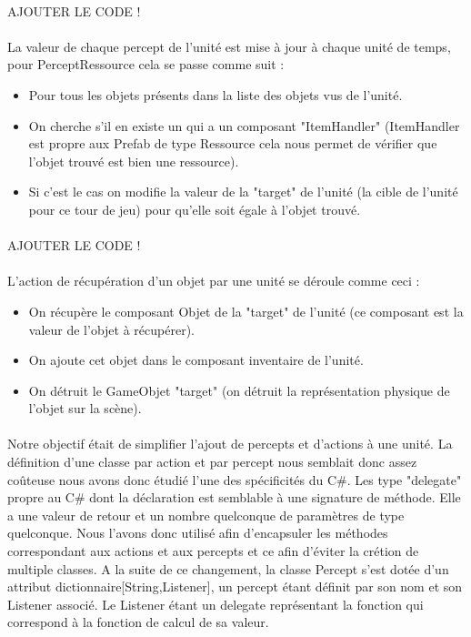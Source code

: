 \documentclass{report}
\begin{document}
\paragraph{}
AJOUTER LE CODE !
\paragraph{}
La valeur de chaque percept de l'unité est mise à jour à chaque unité de temps, pour PerceptRessource cela se passe comme suit :
\begin{itemize}
\item Pour tous les objets présents dans la liste des objets vus de l'unité.
\item On cherche s'il en existe un qui a un composant "ItemHandler" (ItemHandler est propre aux Prefab de type Ressource cela nous permet de vérifier que l'objet trouvé est bien une ressource).
\item Si c'est le cas on modifie la valeur de la "target" de l'unité (la cible de l'unité pour ce tour de jeu) pour qu'elle soit égale à l'objet trouvé.
\end{itemize}
\paragraph{}
AJOUTER LE CODE !
\paragraph{}
L'action de récupération d'un objet par une unité se déroule comme ceci :
\begin{itemize}
\item On récupère le composant Objet de la "target" de l'unité (ce composant est la valeur de l'objet à récupérer).
\item On ajoute cet objet dans le composant inventaire de l'unité.
\item On détruit le GameObjet "target" (on détruit la représentation physique de l'objet sur la scène).
\end{itemize}
\paragraph{}
Notre objectif était de simplifier l'ajout de percepts et d'actions à une unité. La définition d'une classe par action et par percept nous semblait donc assez coûteuse nous avons donc étudié l'une des spécificités du C\#. Les type "delegate" propre au C\# dont la déclaration est semblable à  une signature de méthode. Elle a une valeur de retour et un nombre quelconque de paramètres de type quelconque.
Nous l'avons donc utilisé afin d'encapsuler les méthodes correspondant aux actions et aux percepts et ce afin d'éviter la crétion de multiple classes.
A la suite de ce changement, la classe Percept s'est dotée d'un attribut dictionnaire[String,Listener], un percept étant définit par son nom et son Listener associé. Le Listener étant un delegate représentant la fonction qui correspond à la fonction de calcul de sa valeur.
\end{document}
